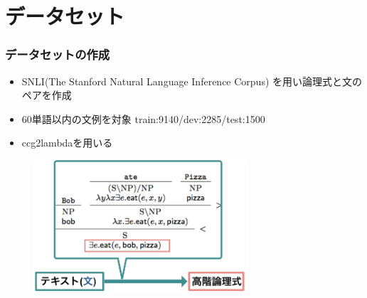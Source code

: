 \documentclass[dvipdfmx]{beamer}
\begin{document}

\section{データセット}
\begin{frame}
\frametitle{データセットの作成}
\begin{itemize}
  \item
SNLI(The Stanford Natural Language Inference Corpus) \citep{snli:emnlp2015}を用い論理式と文のペアを作成

\item 60単語以内の文例を対象
train:9140/dev:2285/test:1500\\

\item ccg2lambdaを用いる

\end{itemize}
\begin{center}
\begin{figure}[h]
	\includegraphics[width=8cm]{editdata.png}
        \label{fig:editdata}
\end{figure}
\end{center}

\end{frame}
\end{document}

